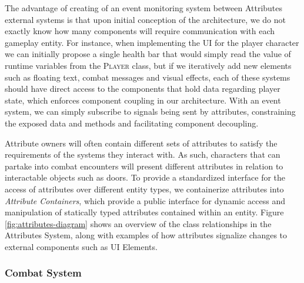 The advantage of creating of an event monitoring system between Attributes external systems is that upon initial conception of the architecture, we do not exactly know how many components will require communication with each gameplay entity. For instance, when implementing the UI for the player character we can initially propose a single health bar that would simply read the value of runtime variables from the \textsc{Player} class, but if we iteratively add new elements such as floating text, combat messages and visual effects, each of these systems should have direct access to the components that hold data regarding player state, which enforces component coupling in our architecture. With an event system, we can simply subscribe to signals being sent by attributes, constraining the exposed data and methods and facilitating component decoupling.

Attribute owners will often contain different sets of attributes to satisfy the requirements of the systems they interact with. As such, characters that can partake into combat encounters will present different attributes in relation to interactable objects such as doors. To provide a standardized interface for the access of attributes over different entity types, we containerize attributes into \emph{Attribute Containers}, which provide a public interface for dynamic access and manipulation of statically typed attributes contained within an entity. Figure \ref{fig:attributes-diagram} shows an overview of the class relationships in the Attributes System, along with examples of how attributes signalize changes to external components such as UI Elements.




\subsubsection{Combat System}

